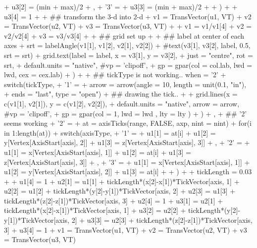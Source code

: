 \documentclass[paper=a4, fontsize=11pt]{report}
\begin{document}
\begin{Schunk}
\begin{Sinput}
{{+         u3[2] = (min + max)/2
+         },
+         '3' = {
+         u3[3] = (min + max)/2
+         }
+     )
+ 
+     u3[4] = 1
+ 
+     ## transform the 3-d into 2-d
+     v1 = TransVector(u1, VT)
+     v2 = TransVector(u2, VT)
+     v3 = TransVector(u3, VT)
+ 
+     v1 = v1/v1[4]
+     v2 = v2/v2[4]
+     v3 = v3/v3[4]
+     
+     ## grid set up
+     
+     ## label at center of each axes
+     srt = labelAngle(v1[1], v1[2], v2[1], v2[2])
+     #text(v3[1], v3[2], label, 0.5, srt = srt)
+     grid.text(label = label, x = v3[1], y = v3[2],
+           just = "centre", rot = srt,
+           default.units = "native", #vp = 'clipoff',
+           gp = gpar(col = col.lab, lwd = lwd, cex = cex.lab)
+           )
+     
+     ## tickType is not working.. when = '2'
+     switch(tickType,
+     '1' = {
+     arrow = arrow(angle = 10, length = unit(0.1, "in"),
+                     ends = "last", type = "open")  
+ 	## drawing the tick..
+     
+     grid.lines(x = c(v1[1], v2[1]), y = c(v1[2], v2[2]),
+           default.units = "native", arrow = arrow, #vp = 'clipoff',
+           gp = gpar(col = 1, lwd = lwd , lty = lty )
+           )
+        },
+     ## '2' seems working
+     '2' = {
+         at = axisTicks(range, FALSE, axp, nint = nint)
+         for(i in 1:length(at)){
+             switch(axisType, 
+                 '1' = {
+                 u1[1] = at[i]
+                 u1[2] = y[Vertex[AxisStart[axis], 2]]
+                 u1[3] = z[Vertex[AxisStart[axis], 3]]
+                 },
+                 '2' = {
+                 u1[1] = x[Vertex[AxisStart[axis], 1]]
+                 u1[2] = at[i]
+                 u1[3] = z[Vertex[AxisStart[axis], 3]]
+                 },
+                 '3' = {
+                 u1[1] = x[Vertex[AxisStart[axis], 1]]
+                 u1[2] = y[Vertex[AxisStart[axis], 2]]
+                 u1[3] = at[i]
+                 }
+             )
+             
+             tickLength = 0.03
+             
+             u1[4] = 1
+             u2[1] = u1[1] + tickLength*(x[2]-x[1])*TickVector[axis, 1]
+             u2[2] = u1[2] + tickLength*(y[2]-y[1])*TickVector[axis, 2]
+             u2[3] = u1[3] + tickLength*(z[2]-z[1])*TickVector[axis, 3]
+             u2[4] = 1
+             u3[1] = u2[1] + tickLength*(x[2]-x[1])*TickVector[axis, 1]
+             u3[2] = u2[2] + tickLength*(y[2]-y[1])*TickVector[axis, 2]
+             u3[3] = u2[3] + tickLength*(z[2]-z[1])*TickVector[axis, 3]
+             u3[4] = 1
+             v1 = TransVector(u1, VT)
+             v2 = TransVector(u2, VT)
+             v3 = TransVector(u3, VT)
}}}
\end{Sinput}
\end{Schunk}
\end{document}
